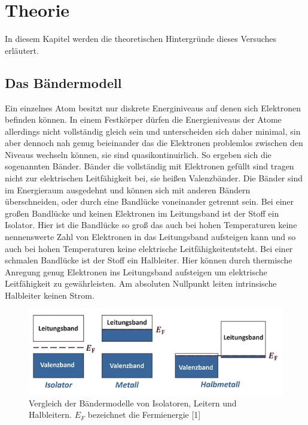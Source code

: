 \section{Theorie} 
\label{sec:Theorie}
In diesem Kapitel werden die theoretischen Hintergründe dieses Versuches erläutert.


\subsection{Das Bändermodell}
\label{sec:baendermodell}
Ein einzelnes Atom besitzt nur diskrete Energiniveaus auf denen sich Elektronen befinden können. In einem 
Festkörper dürfen die Energieniveaus der Atome allerdings nicht vollständig gleich sein und unterscheiden sich 
daher minimal, sin aber dennoch nah genug beieinander das die Elektronen problemlos zwischen den Niveaus 
wechseln können, sie sind quasikontinuirlich. So ergeben sich die sogenannten Bänder. Bänder die vollständig 
mit Elektronen gefüllt sind tragen nicht zur elektrischen Leitfähigkeit bei, sie heißen Valenzbänder. 
Die Bänder sind im Energieraum ausgedehnt und können sich mit anderen Bändern überschneiden, oder durch eine 
Bandlücke voneinander getrennt sein. Bei einer großen Bandlücke und keinen Elektronen im Leitungsband
ist der Stoff ein Isolator. Hier ist die Bandlücke so groß das auch bei hohen Temperaturen keine nennenswerte Zahl
von Elektronen in das Leitungsband aufsteigen kann und so auch bei hohen Temperaturen keine elektrische
Leitfähigkeitentsteht. Bei einer schmalen Bandlücke ist der Stoff ein Halbleiter. Hier können durch thermische 
Anregung genug Elektronen ins Leitungsband aufsteigen um elektrische Leitfähigkeit zu gewährleisten. Am absoluten
Nullpunkt leiten intrinsische Halbleiter keinen Strom.
\begin{figure}
    \centering
    \includegraphics[width=1\textwidth]{content/grafiken/baender.JPG}
    \caption{Vergleich der Bändermodelle von Isolatoren, Leitern und Halbleitern. $E_F$ bezeichnet die Fermienergie [1]}
    \label{fig:baendermodell}
  \end{figure}


